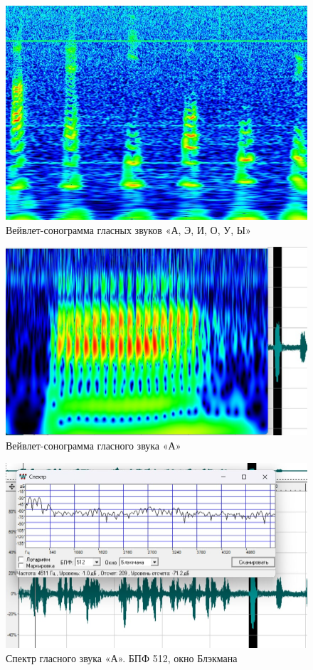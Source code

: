 \begin{figure}
    \centering
    \includegraphics[scale=0.7]{inc/fig_07.jpg}
    \caption{Вейвлет-сонограмма гласных звуков «А, Э, И, О, У, Ы»}
    \label{fig:fig07}
\end{figure}

\begin{figure}
    \centering
    \includegraphics[scale=0.7]{inc/fig_08.jpg}
    \caption{Вейвлет-сонограмма гласного звука «А»}
    \label{fig:fig08}
\end{figure}

\begin{figure}
    \centering
    \includegraphics[scale=0.7]{inc/fig_09.jpg}
    \caption{Спектр гласного звука «А». БПФ 512, окно Блэкмана}
    \label{fig:fig09}
\end{figure}

